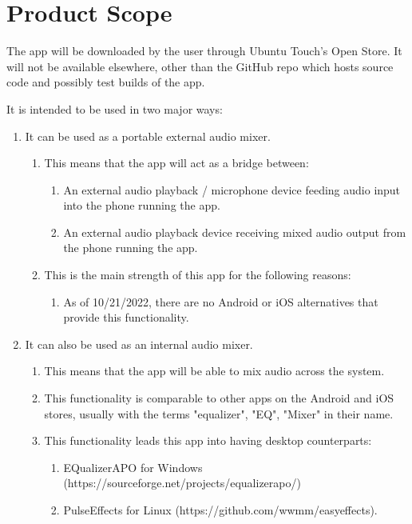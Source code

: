 \section{Product Scope}


The app will be downloaded by the user through Ubuntu Touch's Open Store. 
It will not be available elsewhere, other than the GitHub repo which hosts source code and possibly test builds of the app.

It is intended to be used in two major ways:

\begin{enumerate}
	\item It can be used as a portable external audio mixer.
	\begin{enumerate} 
		\item This means that the app will act as a bridge between:
			\begin{enumerate}
				\item An external audio playback / microphone device feeding audio input into the phone running the app.
				\item An external audio playback device receiving mixed audio output from the phone running the app.
			\end{enumerate}
		\item This is the main strength of this app for the following reasons: 
		\begin{enumerate}
				\item As of 10/21/2022, there are no Android or iOS alternatives that provide this functionality.
			\end{enumerate}
	\end{enumerate}
	\item It can also be used as an internal audio mixer. 
	\begin{enumerate} 
		\item This means that the app will be able to mix audio across the system.
		\item This functionality is comparable to other apps on the Android and iOS stores, usually with the terms "equalizer", "EQ", "Mixer" in their name.
		\item This functionality leads this app into having desktop counterparts: 
		\begin{enumerate}
			\item EQualizerAPO for Windows (https://sourceforge.net/projects/equalizerapo/)
			\item PulseEffects for Linux (https://github.com/wwmm/easyeffects).
		\end{enumerate}


\end{enumerate}
\end{enumerate}
